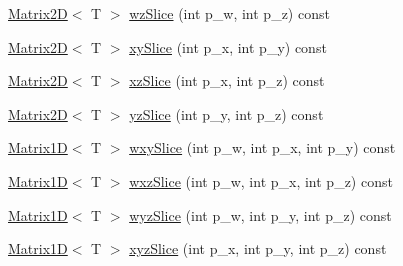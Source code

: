 \begin{DoxyCompactItemize}
\item 
\hyperlink{class_matrix2_d}{Matrix2\+D}$<$ T $>$ \hyperlink{class_matrix4_d_a479ded858b58a4c182e8ba947886677e}{wz\+Slice} (int p\+\_\+w, int p\+\_\+z) const 
\item 
\hyperlink{class_matrix2_d}{Matrix2\+D}$<$ T $>$ \hyperlink{class_matrix4_d_aec288477883fd993b2ae8ab331156c86}{xy\+Slice} (int p\+\_\+x, int p\+\_\+y) const 
\item 
\hyperlink{class_matrix2_d}{Matrix2\+D}$<$ T $>$ \hyperlink{class_matrix4_d_abde9b066ed58b4e2d3d522771dbfc0ab}{xz\+Slice} (int p\+\_\+x, int p\+\_\+z) const 
\item 
\hyperlink{class_matrix2_d}{Matrix2\+D}$<$ T $>$ \hyperlink{class_matrix4_d_add2abd98a79fb8751af93cfcdb542915}{yz\+Slice} (int p\+\_\+y, int p\+\_\+z) const 
\item 
\hyperlink{class_matrix1_d}{Matrix1\+D}$<$ T $>$ \hyperlink{class_matrix4_d_a7edfe6d3cb8323bf34068596cc9e5ed4}{wxy\+Slice} (int p\+\_\+w, int p\+\_\+x, int p\+\_\+y) const 
\item 
\hyperlink{class_matrix1_d}{Matrix1\+D}$<$ T $>$ \hyperlink{class_matrix4_d_abed7f7d85792eded1162fea2e2d3f5e2}{wxz\+Slice} (int p\+\_\+w, int p\+\_\+x, int p\+\_\+z) const 
\item 
\hyperlink{class_matrix1_d}{Matrix1\+D}$<$ T $>$ \hyperlink{class_matrix4_d_a4e95d93f0626fdf4f996ef23ffa5c439}{wyz\+Slice} (int p\+\_\+w, int p\+\_\+y, int p\+\_\+z) const 
\item 
\hyperlink{class_matrix1_d}{Matrix1\+D}$<$ T $>$ \hyperlink{class_matrix4_d_a49da218c235770ba2bd3ae30af817af7}{xyz\+Slice} (int p\+\_\+x, int p\+\_\+y, int p\+\_\+z) const 
\end{DoxyCompactItemize}
